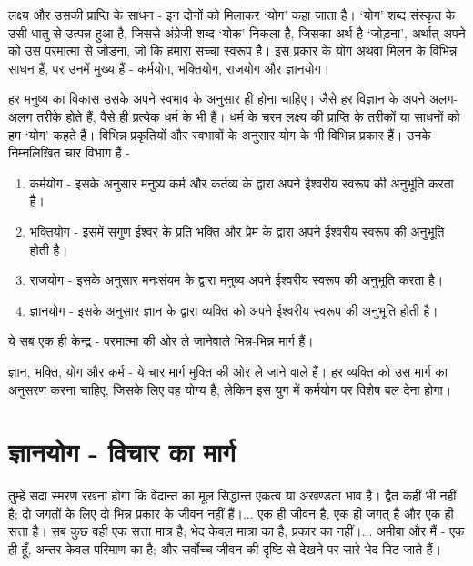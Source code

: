 लक्ष्य और उसकी प्राप्ति के साधन - इन दोनों को मिलाकर ‘योग’ कहा जाता है। ‘योग’ शब्द संस्कृत के उसी धातु से उत्पन्न हुआ है, जिससे अंग्रेजी शब्द ‘योक’ निकला है, जिसका अर्थ है ‘जोड़ना’, अर्थात् अपने को उस परमात्मा से जोड़ना, जो कि हमारा सच्चा स्वरूप है। इस प्रकार के योग अथवा मिलन के विभिन्न साधन हैं, पर उनमें मुख्य हैं - कर्मयोग, भक्तियोग, राजयोग और ज्ञानयोग। 

हर मनुष्य का विकास उसके अपने स्वभाव के अनुसार ही होना चाहिए। जैसे हर विज्ञान के अपने अलग-अलग तरीके होते हैं, वैसे ही प्रत्येक धर्म के भी हैं। धर्म के चरम लक्ष्य की प्राप्ति के तरीकों या साधनों को हम ‘योग’ कहते हैं। विभिन्न प्रकृतियों और स्वभावों के अनुसार योग के भी विभिन्न प्रकार हैं। उनके निम्नलिखित चार विभाग हैं -

\begin{enumerate}
\item कर्मयोग - इसके अनुसार मनुष्य कर्म और कर्तव्य के द्वारा अपने ईश्वरीय स्वरूप की अनुभूति करता है। 

 \item भक्तियोग - इसमें सगुण ईश्वर के प्रति भक्ति और प्रेम के द्वारा अपने ईश्वरीय स्वरूप की अनुभूति होती है। 

 \item राजयोग - इसके अनुसार मनःसंयम के द्वारा मनुष्य अपने ईश्वरीय स्वरूप की अनुभूति करता है। 

 \item ज्ञानयोग - इसके अनुसार ज्ञान के द्वारा व्यक्ति को अपने ईश्वरीय स्वरूप की अनुभूति होती है। 

\end{enumerate}

ये सब एक ही केन्द्र - परमात्मा की ओर ले जानेवाले भिन्न-भिन्न मार्ग हैं। 

ज्ञान, भक्ति, योग और कर्म - ये चार मार्ग मुक्ति की ओर ले जाने वाले हैं। हर व्यक्ति को उस मार्ग का अनुसरण करना चाहिए, जिसके लिए वह योग्य है, लेकिन इस युग में कर्मयोग पर विशेष बल देना होगा।


\section*{ज्ञानयोग - विचार का मार्ग}


तुम्हें सदा स्मरण रखना होगा कि वेदान्त का मूल सिद्धान्त एकत्व या अखण्डता भाव है। द्वैत कहीं भी नहीं है; दो जगतों के लिए दो भिन्न प्रकार के जीवन नहीं हैं।... एक ही जीवन है, एक ही जगत् है और एक ही सत्ता है। सब कुछ वही एक सत्ता मात्र है; भेद केवल मात्रा का है, प्रकार का नहीं।... अमीबा और मैं - एक ही हूँ, अन्तर केवल परिमाण का है; और सर्वोच्च जीवन की दृष्टि से देखने पर सारे भेद मिट जाते हैं। 

